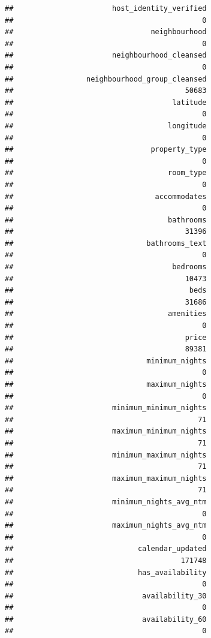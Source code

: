 \documentclass[
]{article}
\begin{document}
\begin{verbatim}
##                       host_identity_verified 
##                                            0 
##                                neighbourhood 
##                                            0 
##                       neighbourhood_cleansed 
##                                            0 
##                 neighbourhood_group_cleansed 
##                                        50683 
##                                     latitude 
##                                            0 
##                                    longitude 
##                                            0 
##                                property_type 
##                                            0 
##                                    room_type 
##                                            0 
##                                 accommodates 
##                                            0 
##                                    bathrooms 
##                                        31396 
##                               bathrooms_text 
##                                            0 
##                                     bedrooms 
##                                        10473 
##                                         beds 
##                                        31686 
##                                    amenities 
##                                            0 
##                                        price 
##                                        89381 
##                               minimum_nights 
##                                            0 
##                               maximum_nights 
##                                            0 
##                       minimum_minimum_nights 
##                                           71 
##                       maximum_minimum_nights 
##                                           71 
##                       minimum_maximum_nights 
##                                           71 
##                       maximum_maximum_nights 
##                                           71 
##                       minimum_nights_avg_ntm 
##                                            0 
##                       maximum_nights_avg_ntm 
##                                            0 
##                             calendar_updated 
##                                       171748 
##                             has_availability 
##                                            0 
##                              availability_30 
##                                            0 
##                              availability_60 
##                                            0 

\end{verbatim}
\end{document}
